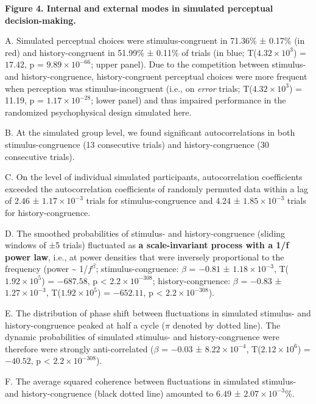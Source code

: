 \documentclass[
]{article}
\begin{document}
\textbf{Figure 4. Internal and external modes in simulated perceptual
decision-making.}

A. Simulated perceptual choices were stimulus-congruent in 71.36\% ±
0.17\% (in red) and history-congruent in 51.99\% ± 0.11\% of trials (in
blue; T(\(\ensuremath{4.32\times 10^{3}}\)) = \(17.42\), p =
\(\ensuremath{9.89\times 10^{-66}}\); upper panel). Due to the
competition between stimulus- and history-congruence, history-congruent
perceptual choices were more frequent when perception was
stimulus-incongruent (i.e., on \emph{error} trials;
T(\ensuremath{4.32\times 10^{3}}) = 11.19, p =
\(\ensuremath{1.17\times 10^{-28}}\); lower panel) and thus impaired
performance in the randomized psychophysical design simulated here.

B. At the simulated group level, we found significant autocorrelations
in both stimulus-congruence (13 consecutive trials) and
history-congruence (30 consecutive trials).

C. On the level of individual simulated participants, autocorrelation
coefficients exceeded the autocorrelation coefficients of randomly
permuted data within a lag of \(2.46\) ±
\(\ensuremath{1.17\times 10^{-3}}\) trials for stimulus-congruence and
\(4.24\) ± \(\ensuremath{1.85\times 10^{-3}}\) trials for
history-congruence.

D. The smoothed probabilities of stimulus- and history-congruence
(sliding windows of ±5 trials) fluctuated as \textbf{a scale-invariant
process with a 1/f power law}, i.e., at power densities that were
inversely proportional to the frequency (power \textasciitilde{}
1/\(f^\beta\); stimulus-congruence: \(\beta\) = \(-0.81\) ±
\(\ensuremath{1.18\times 10^{-3}}\),
T(\(\ensuremath{1.92\times 10^{5}}\)) = \(-687.58\), p < \(\ensuremath{2.2\times 10^{-308}}\);
history-congruence: \(\beta\) = \(-0.83\) ±
\(\ensuremath{1.27\times 10^{-3}}\),
T(\(\ensuremath{1.92\times 10^{5}}\)) = \(-652.11\), p < \(\ensuremath{2.2\times 10^{-308}}\)).

E. The distribution of phase shift between fluctuations in simulated
stimulus- and history-congruence peaked at half a cycle (\(\pi\) denoted
by dotted line). The dynamic probabilities of simulated stimulus- and
history-congruence were therefore were strongly anti-correlated
(\(\beta\) = \(-0.03\) ± \(\ensuremath{8.22\times 10^{-4}}\),
T(\(\ensuremath{2.12\times 10^{6}}\)) = \(-40.52\), p < \(\ensuremath{2.2\times 10^{-308}}\)).

F. The average squared coherence between fluctuations in simulated
stimulus- and history-congruence (black dotted line) amounted to
\(6.49\) ± \(\ensuremath{2.07\times 10^{-3}}\)\%.
\end{document}
